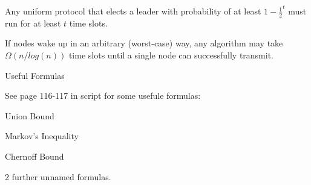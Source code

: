 {
	Any uniform protocol that elects a leader with probability of at least $1-{\frac{1}{2}}^t$ 
	must run for at least $t$ time slots.
}

{
	If nodes wake up in an arbitrary (worst-case) way, any algorithm may take 
	$\Omega(n/log(n))$ time slots until a single node can successfully transmit.
}

{\LARGE Useful Formulas}

See page 116-117 in script for some usefule formulas:
\begin{items}
	\item Union Bound
	\item Markov's Inequality
	\item Chernoff Bound
	\item 2 further unnamed formulas.
\end{items}






